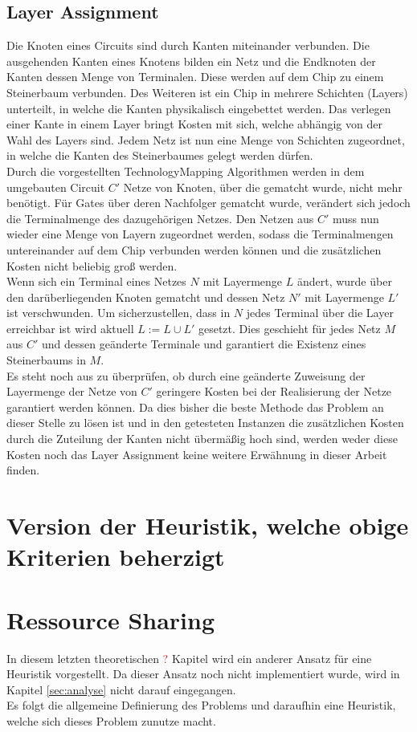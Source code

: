 \documentclass[11pt, a4paper, german]{article}
\newcommand{\TM}{TechnologyMapping }
\begin{document}
\subsection{Layer Assignment}
Die Knoten eines Circuits sind durch Kanten miteinander verbunden.  Die ausgehenden Kanten eines Knotens bilden ein Netz und  die Endknoten der Kanten dessen Menge von Terminalen. Diese werden auf dem Chip zu einem Steinerbaum verbunden. Des Weiteren ist ein Chip in mehrere Schichten (Layers) unterteilt, in welche die Kanten physikalisch eingebettet werden. Das verlegen einer Kante in einem Layer bringt Kosten mit sich, welche abhängig von der Wahl des Layers sind. Jedem Netz ist nun eine Menge von Schichten zugeordnet, in welche die Kanten des Steinerbaumes gelegt werden dürfen. \\
Durch die vorgestellten \TM Algorithmen  werden in dem umgebauten Circuit $C'$ Netze von Knoten, über die gematcht wurde, nicht mehr benötigt. Für Gates über deren Nachfolger gematcht wurde, verändert sich jedoch die Terminalmenge des dazugehörigen Netzes. Den Netzen aus $C'$ muss nun wieder eine Menge von Layern zugeordnet werden, sodass die  Terminalmengen untereinander auf dem Chip verbunden werden können und die zusätzlichen Kosten nicht beliebig groß werden. \\
Wenn sich ein Terminal eines Netzes $N$ mit Layermenge $L$ ändert, wurde über den darüberliegenden Knoten gematcht und dessen Netz $N'$ mit Layermenge $L'$ ist verschwunden. Um sicherzustellen, dass in $N$ jedes Terminal über die Layer erreichbar ist wird aktuell $L := L \cup L'$ gesetzt. Dies geschieht für jedes Netz $M$ aus $C'$ und dessen geänderte Terminale und garantiert die Existenz eines Steinerbaums in $M$. \\
Es steht noch aus zu überprüfen, ob durch eine geänderte Zuweisung der Layermenge der Netze von $C'$ geringere Kosten bei der Realisierung der Netze garantiert werden können.
Da dies bisher die beste Methode das Problem an dieser Stelle zu lösen ist und in den getesteten Instanzen die zusätzlichen Kosten durch die Zuteilung der Kanten nicht übermäßig hoch sind, werden weder diese Kosten noch das Layer Assignment keine weitere Erwähnung in dieser Arbeit finden.
	
	
\section{Version der Heuristik, welche obige Kriterien beherzigt}
\section{Ressource Sharing}
In diesem letzten theoretischen \textcolor{red}{?} Kapitel wird ein anderer Ansatz für eine Heuristik vorgestellt. Da dieser Ansatz noch nicht implementiert wurde, wird in Kapitel \ref{sec:analyse} nicht darauf eingegangen.\\
Es folgt die allgemeine Definierung des Problems und daraufhin eine Heuristik, welche sich dieses Problem zunutze macht.\\
\end{document}
